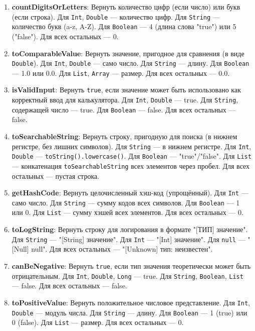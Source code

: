 \begin{enumerate}
    \item \textbf{countDigitsOrLetters}: Вернуть количество цифр (если число) или букв (если строка). Для \texttt{Int}, \texttt{Double} — количество цифр. Для \texttt{String} — количество букв (a-z, A-Z). Для \texttt{Boolean} — 4 (длина слова "true") или 5 ("false"). Для всех остальных — 0.
    \item \textbf{toComparableValue}: Вернуть значение, пригодное для сравнения (в виде \texttt{Double}). Для \texttt{Int}, \texttt{Double} — само число. Для \texttt{String} — длину. Для \texttt{Boolean} — 1.0 или 0.0. Для \texttt{List}, \texttt{Array} — размер. Для всех остальных — 0.0.
    \item \textbf{isValidInput}: Вернуть \texttt{true}, если значение может быть использовано как корректный ввод для калькулятора. Для \texttt{Int}, \texttt{Double} — true. Для \texttt{String}, содержащей число — true. Для \texttt{Boolean} — false. Для всех остальных — false.
    \item \textbf{toSearchableString}: Вернуть строку, пригодную для поиска (в нижнем регистре, без лишних символов). Для \texttt{String} — в нижнем регистре. Для \texttt{Int}, \texttt{Double} — \texttt{toString().lowercase()}. Для \texttt{Boolean} — "true"/"false". Для \texttt{List} — конкатенация \texttt{toSearchableString} всех элементов через пробел. Для всех остальных — пустая строка.
    \item \textbf{getHashCode}: Вернуть целочисленный хэш-код (упрощённый). Для \texttt{Int} — само число. Для \texttt{String} — сумму кодов всех символов. Для \texttt{Boolean} — 1 или 0. Для \texttt{List} — сумму хэшей всех элементов. Для всех остальных — 0.
    \item \textbf{toLogString}: Вернуть строку для логирования в формате "[ТИП] значение". Для \texttt{String} — "[String] значение". Для \texttt{Int} — "[Int] значение". Для \texttt{null} — "[Null] null". Для всех остальных — "[Unknown] тип: неизвестен".
    \item \textbf{canBeNegative}: Вернуть \texttt{true}, если тип значения теоретически может быть отрицательным. Для \texttt{Int}, \texttt{Double}, \texttt{Long} — true. Для \texttt{String}, \texttt{Boolean}, \texttt{List} — false. Для всех остальных — false.
    \item \textbf{toPositiveValue}: Вернуть положительное числовое представление. Для \texttt{Int}, \texttt{Double} — модуль числа. Для \texttt{String} — длину. Для \texttt{Boolean} — 1 (true) или 0 (false). Для \texttt{List} — размер. Для всех остальных — 0.

\end{enumerate}
